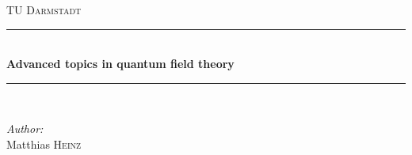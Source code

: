\documentclass[12pt]{memoir}
\begin{document}



\frontmatter

\begin{titlingpage}

\newcommand{\HRule}{\rule{\linewidth}{0.5mm}} %

\center %


\textsc{\LARGE TU Darmstadt}\\[1.5cm] %


\HRule \\[0.4cm]
{ \huge \bfseries Advanced topics in quantum field theory}\\[0.4cm] %
\HRule \\[1.5cm]


\begin{minipage}{0.4\textwidth}
\begin{flushleft} \large
\emph{Author:}\\
Matthias \textsc{Heinz}\\ %
\end{flushleft}


\end{minipage}
\end{titlingpage}
\end{document}
